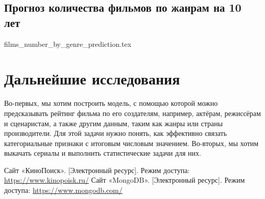 \documentclass[9pt,conference]{IEEEtran}
\begin{document}
\subsection{Прогноз количества фильмов по жанрам на 10 лет}

{films_number_by_genre_prediction.tex}

\section{Дальнейшие исследования}

Во-первых, мы хотим построить модель, с помощью которой можно предсказывать рейтинг фильма по его создателям, например, актёрам, режиссёрам и сценаристам, а также другим данным, таким как жанры или страны производители. Для этой задачи нужно понять, как эффективно связать категориальные признаки с итоговым числовым значением. Во-вторых, мы хотим выкачать сериалы и выполнить статистические задачи для них.

\begin{thebibliography}{00}
 Сайт «КиноПоиск». [Электронный ресурс]. Режим доступа: \url{https://www.kinopoisk.ru/}
 Сайт «MongoDB». [Электронный ресурс]. Режим доступа: \url{https://www.mongodb.com/}

\end{thebibliography}
\end{document}
